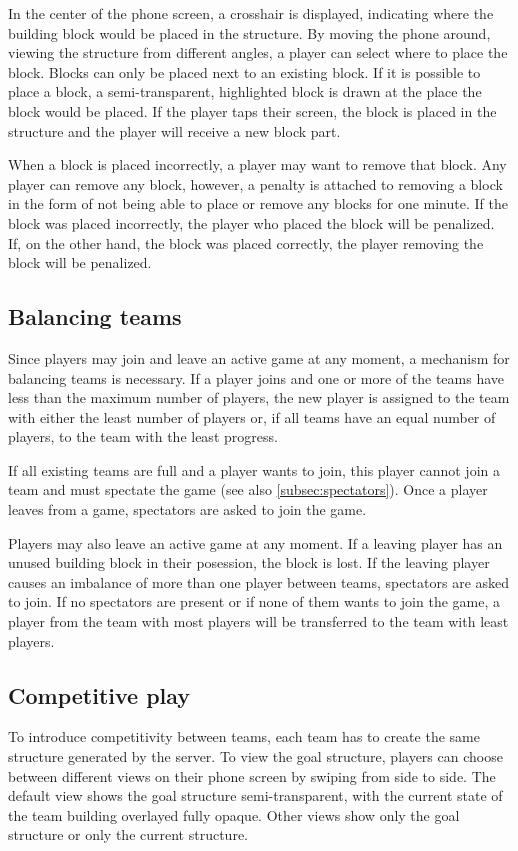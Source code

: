 \documentclass[a4paper,titlepage]{scrartcl}
\begin{document}
In the center of the phone screen, a crosshair is displayed, indicating where the building block would be placed in the structure. By moving the phone around, viewing the structure from different angles, a player can select where to place the block. Blocks can only be placed next to an existing block. If it is possible to place a block, a semi-transparent, highlighted block is drawn at the place the block would be placed. If the player taps their screen, the block is placed in the structure and the player will receive a new block part.

When a block is placed incorrectly, a player may want to remove that block. Any player can remove any block, however, a penalty is attached to removing a block in the form of not being able to place or remove any blocks for one minute. If the block was placed incorrectly, the player who placed the block will be penalized. If, on the other hand, the block was placed correctly, the player removing the block will be penalized.

\subsection{Balancing teams}
Since players may join and leave an active game at any moment, a mechanism for balancing teams is necessary. If a player joins and one or more of the teams have less than the maximum number of players, the new player is assigned to the team with either the least number of players or, if all teams have an equal number of players, to the team with the least progress.

If all existing teams are full and a player wants to join, this player cannot join a team and must spectate the game (see also \ref{subsec:spectators}). Once a player leaves from a game, spectators are asked to join the game. 

Players may also leave an active game at any moment. If a leaving player has an unused building block in their posession, the block is lost. If the leaving player causes an imbalance of more than one player between teams, spectators are asked to join. If no spectators are present or if none of them wants to join the game, a player from the team with most players will be transferred to the team with least players.


\subsection{Competitive play}
To introduce competitivity between teams, each team has to create the same structure generated by the server. To view the goal structure, players can choose between different views on their phone screen by swiping from side to side. The default view shows the goal structure semi-transparent, with the current state of the team building overlayed fully opaque. Other views show only the goal structure or only the current structure.
\end{document}
